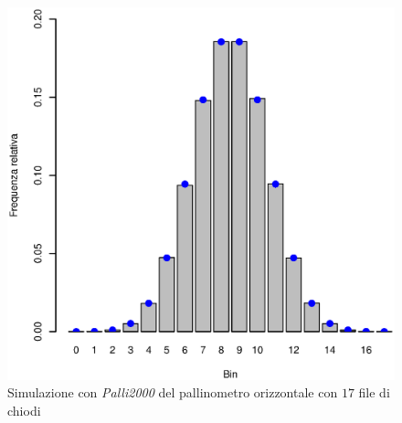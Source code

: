 \documentclass[10pt,oneside,a4paper]{article}
\begin{document}
\begin{figure}[H]
\caption{Simulazione con \emph{Palli2000} del pallinometro orizzontale con $17$ file di chiodi}
\label{fig:palli2000_orizzontale_17}
\centering
\includegraphics[scale=0.5]{palli2000_orizz_3.eps}
\end{figure}
\end{document}
